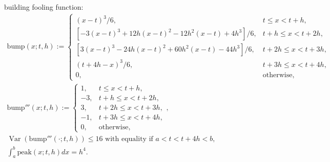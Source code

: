 \documentclass{iitthesis}
\DeclareMathOperator{\Var}{Var}
\theoremstyle{definition}
\theoremstyle{remark}
\begin{document}

building fooling function:
\begin{subequations} \label{bumpfunction}
\begin{gather}
\text{bump}(x;t,h):= \begin{cases} \displaystyle (x-t)^3/6, & t \le x < t+h,\\[1ex]
\displaystyle [-3(x-t)^3+12h(x-t)^2-12h^2(x-t)+4h^3]/6, & t+h \le x < t+2h,\\[1ex]
\displaystyle [3(x-t)^3-24h(x-t)^2+60h^2(x-t)-44h^3]/6, & t+2h \le x < t+3h,\\[1ex]
\displaystyle (t+4h-x)^3/6, & t+3h \le x < t+4h,\\[1ex]
\displaystyle  0, & \text{otherwise},
\end{cases}
\\
\text{bump}'''(x;t,h):= \begin{cases} \displaystyle 1, & t \le x < t+h,\\[1ex]
\displaystyle -3, & t+h \le x < t+2h,\\[1ex]
\displaystyle 3, & t+2h \le x < t+3h,\\[1ex]
\displaystyle -1, & t+3h \le x < t+4h,\\[1ex]
\displaystyle  0, & \text{otherwise},
\end{cases}, \\
\Var(\text{bump}'''(\cdot;t,h))\le 16 \text{ with equality if } a<t<t+4h<b, \\
\int_{a}^{b}\text{peak}(x;t,h)dx=h^4.
\end{gather}
\end{subequations}
\end{document}
